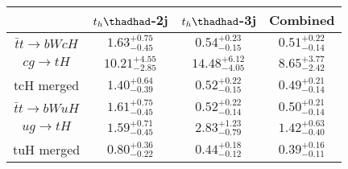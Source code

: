 \centering
\begin{tabular}{|c|c|c|c|} \hline
 & $t_h\thadhad$-2j & $t_h\thadhad$-3j & Combined\\\hline
$\bar{t}t\to bWcH$ & $1.63^{+0.75}_{-0.45}$ & $0.54^{+0.23}_{-0.15}$ & $0.51^{+0.22}_{-0.14}$\\\hline
$cg\to tH$ & $10.21^{+4.55}_{-2.85}$ & $14.48^{+6.12}_{-4.05}$ & $8.65^{+3.77}_{-2.42}$\\\hline
tcH merged & $1.40^{+0.64}_{-0.39}$ & $0.52^{+0.22}_{-0.15}$ & $0.49^{+0.21}_{-0.14}$\\\hline
$\bar{t}t\to bWuH$ & $1.61^{+0.75}_{-0.45}$ & $0.52^{+0.22}_{-0.14}$ & $0.50^{+0.21}_{-0.14}$\\\hline
$ug\to tH$ & $1.59^{+0.71}_{-0.45}$ & $2.83^{+1.23}_{-0.79}$ & $1.42^{+0.63}_{-0.40}$\\\hline
tuH merged & $0.80^{+0.36}_{-0.22}$ & $0.44^{+0.18}_{-0.12}$ & $0.39^{+0.16}_{-0.11}$\\\hline
\end{tabular}
